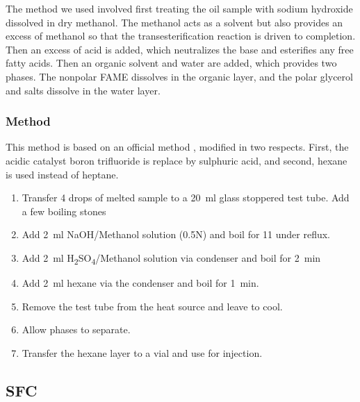 The method we used involved first treating the oil sample with sodium hydroxide
dissolved in dry methanol. The methanol acts as a solvent but also provides an
excess of methanol so that the transesterification reaction is driven to
completion. Then an excess of acid is added, which neutralizes the base and
esterifies any free fatty acids. Then an organic solvent and water are added,
which provides two phases. The nonpolar   FAME dissolves in the organic layer,
and the polar glycerol and salts dissolve in the water layer.

\subsubsection{Method}

This method is based on an official method \autocite{AOCS2017}, modified in two
respects. First, the acidic catalyst boron trifluoride is replace by sulphuric
acid, and second, hexane is used instead of heptane.

\begin{enumerate}
  
\item Transfer \num{4} drops of melted sample to a \SI{20}{\milli\litre} glass
stoppered test tube. Add a few boiling stones

\item Add \SI{2}{\milli\litre} NaOH/Methanol solution (0.5N) and boil for
\SI{11}{\min} under reflux.

\item Add \SI{2}{\milli\litre} H\textsubscript{2}SO\textsubscript{4}/Methanol
solution via condenser and boil for \SI{2}{\minute}

\item  Add \SI{2}{\milli\litre} hexane via the condenser and boil for
\SI{1}{\minute}.

\item Remove the test tube from the heat source and leave to cool.

\item Allow phases to separate.

\item Transfer the hexane layer to a vial and use for injection.

\end{enumerate}

\subsection{SFC}

